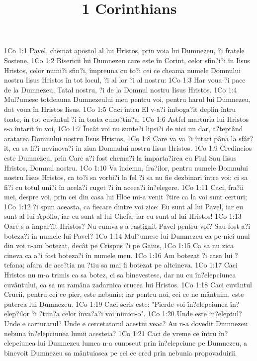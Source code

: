 

\title{1 Corinthians}

1Co 1:1  Pavel, chemat apostol al lui Hristos, prin voia lui Dumnezeu, ?i fratele Sostene,
1Co 1:2  Bisericii lui Dumnezeu care este în Corint, celor sfin?i?i în Iisus Hristos, celor numi?i sfin?i, împreuna cu to?i cei ce cheama numele Domnului nostru Iisus Hristos în tot locul, ?i al lor ?i al nostru:
1Co 1:3  Har voua ?i pace de la Dumnezeu, Tatal nostru, ?i de la Domnul nostru Iisus Hristos.
1Co 1:4  Mul?umesc totdeauna Dumnezeului meu pentru voi, pentru harul lui Dumnezeu, dat voua în Hristos Iisus.
1Co 1:5  Caci întru El v-a?i îmboga?it deplin întru toate, în tot cuvântul ?i în toata cuno?tin?a;
1Co 1:6  Astfel marturia lui Hristos s-a întarit în voi,
1Co 1:7  Încât voi nu sunte?i lipsi?i de nici un dar, a?teptând aratarea Domnului nostru Iisus Hristos,
1Co 1:8  Care va va ?i întari pâna la sfâr?it, ca sa fi?i nevinova?i în ziua Domnului nostru Iisus Hristos.
1Co 1:9  Credincios este Dumnezeu, prin Care a?i fost chema?i la împarta?irea cu Fiul Sau Iisus Hristos, Domnul nostru.
1Co 1:10  Va îndemn, fra?ilor, pentru numele Domnului nostru Iisus Hristos, ca to?i sa vorbi?i la fel ?i sa nu fie dezbinari între voi; ci sa fi?i cu totul uni?i în acela?i cuget ?i în aceea?i în?elegere.
1Co 1:11  Caci, fra?ii mei, despre voi, prin cei din casa lui Hloe mi-a venit ?tire ca la voi sunt certuri;
1Co 1:12  ?i spun aceasta, ca fiecare dintre voi zice: Eu sunt al lui Pavel, iar eu sunt al lui Apollo, iar eu sunt al lui Chefa, iar eu sunt al lui Hristos!
1Co 1:13  Oare s-a împar?it Hristos? Nu cumva s-a rastignit Pavel pentru voi? Sau fost-a?i boteza?i în numele lui Pavel?
1Co 1:14  Mul?umesc lui Dumnezeu ca pe nici unul din voi n-am botezat, decât pe Crispus ?i pe Gaius,
1Co 1:15  Ca sa nu zica cineva ca a?i fost boteza?i în numele meu.
1Co 1:16  Am botezat ?i casa lui ?tefana; afara de ace?tia nu ?tiu sa mai fi botezat pe altcineva.
1Co 1:17  Caci Hristos nu m-a trimis ca sa botez, ci sa binevestesc, dar nu cu în?elepciunea cuvântului, ca sa nu ramâna zadarnica crucea lui Hristos.
1Co 1:18  Caci cuvântul Crucii, pentru cei ce pier, este nebunie; iar pentru noi, cei ce ne mântuim, este puterea lui Dumnezeu.
1Co 1:19  Caci scris este: "Pierde-voi în?elepciunea în?elep?ilor ?i ?tiin?a celor înva?a?i voi nimici-o".
1Co 1:20  Unde este în?eleptul? Unde e carturarul? Unde e cercetatorul acestui veac? Au n-a dovedit Dumnezeu nebuna în?elepciunea lumii acesteia?
1Co 1:21  Caci de vreme ce întru în?elepciunea lui Dumnezeu lumea n-a cunoscut prin în?elepciune pe Dumnezeu, a binevoit Dumnezeu sa mântuiasca pe cei ce cred prin nebunia propovaduirii.
